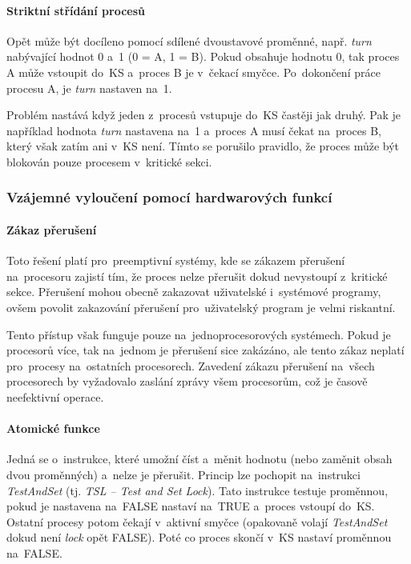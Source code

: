 \paragraph{Striktní střídání procesů}

Opět může být docíleno pomocí sdílené dvoustavové proměnné, např. \emph{turn} nabývající hodnot 0 a~1 (0 = A, 1 = B). Pokud obsahuje hodnotu 0, tak proces A může vstoupit do~KS a~proces B je v~čekací smyčce. Po~dokončení práce procesu A, je \emph{turn} nastaven na~1.

Problém nastává když jeden z~procesů vstupuje do~KS častěji jak druhý. Pak je například hodnota \emph{turn} nastavena na~1 a~proces A musí čekat na~proces B, který však zatím ani v~KS není. Tímto se porušilo pravidlo, že proces může být blokován pouze procesem v~kritické sekci.

\subsubsection{Vzájemné vyloučení pomocí hardwarových funkcí}

\paragraph{Zákaz přerušení}

Toto řešení platí pro~preemptivní systémy, kde se zákazem přerušení na~procesoru zajistí tím, že proces nelze přerušit dokud nevystoupí z~kritické sekce. Přerušení mohou obecně zakazovat uživatelské i~systémové programy, ovšem povolit zakazování přerušení pro~uživatelský program je velmi riskantní.

Tento přístup však funguje pouze na~jednoprocesorových systémech. Pokud je procesorů více, tak na~jednom je přerušení sice zakázáno, ale tento zákaz neplatí pro~procesy na~ostatních procesorech. Zavedení zákazu přerušení na~všech procesorech by vyžadovalo zaslání zprávy všem procesorům, což je časově neefektivní operace.

\paragraph{Atomické funkce}

Jedná se o~instrukce, které umožní číst a~měnit hodnotu (nebo zaměnit obsah dvou proměnných) a~nelze je přerušit. Princip lze pochopit na~instrukci \emph{TestAndSet} (tj. \emph{TSL -- Test and Set Lock}). Tato instrukce testuje proměnnou, pokud je nastavena na~FALSE nastaví na~TRUE a~proces vstoupí do~KS. Ostatní procesy potom čekají v~aktivní smyčce (opakovaně volají \emph{TestAndSet} dokud není \emph{lock} opět FALSE). Poté co proces skončí v~KS nastaví proměnnou na~FALSE.

